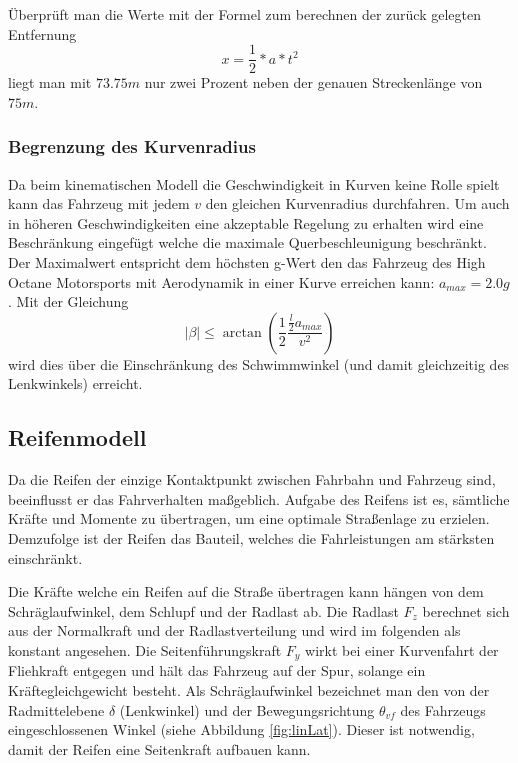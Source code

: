 \documentclass{like}
\begin{document}
Überprüft man die Werte mit der Formel zum berechnen der zurück gelegten Entfernung 
\begin{equation}
x = \frac{1}{2} * a * t^2  
\end{equation}
liegt man mit \(73.75m\) nur zwei Prozent neben der genauen Streckenlänge von \(75m\).

\subsubsection*{Begrenzung des Kurvenradius}
Da beim kinematischen Modell die Geschwindigkeit in Kurven keine Rolle spielt kann das Fahrzeug mit jedem \(v\) den gleichen Kurvenradius durchfahren. Um auch in höheren Geschwindigkeiten eine akzeptable Regelung zu erhalten wird eine Beschränkung eingefügt welche die maximale Querbeschleunigung beschränkt. Der Maximalwert entspricht dem höchsten g-Wert den das Fahrzeug des High Octane Motorsports mit Aerodynamik in einer Kurve erreichen kann: $a_{max} = 2.0g$. 
Mit der Gleichung
\begin{equation}
	|\beta| \leq \arctan(\frac{1}{2} \frac{\frac{l}{2} a_{max}}{v^2})
\end{equation}
wird dies über die Einschränkung des Schwimmwinkel (und damit gleichzeitig des Lenkwinkels) erreicht.


\subsection{Reifenmodell}
\label{tireModel}
Da die Reifen der einzige Kontaktpunkt zwischen Fahrbahn und Fahrzeug sind,  beeinflusst er das Fahrverhalten maßgeblich. Aufgabe des Reifens ist es, sämtliche Kräfte und Momente zu übertragen, um eine optimale Straßenlage zu erzielen. Demzufolge ist der Reifen das Bauteil, welches die Fahrleistungen am stärksten einschränkt.

Die Kräfte welche ein Reifen auf die Straße übertragen kann hängen von dem Schräglaufwinkel, dem Schlupf und der Radlast ab. Die Radlast \(F_z\) berechnet sich aus der Normalkraft und der Radlastverteilung und wird im folgenden als konstant angesehen.
Die Seitenführungskraft \(F_y\) wirkt bei einer Kurvenfahrt der Fliehkraft entgegen und hält das Fahrzeug auf der Spur, solange ein Kräftegleichgewicht besteht. Als Schräglaufwinkel bezeichnet man den von der Radmittelebene \(\delta\) (Lenkwinkel) und der Bewegungsrichtung \(\theta_{vf}\) des Fahrzeugs eingeschlossenen Winkel (siehe Abbildung \ref{fig:linLat}). Dieser ist notwendig, damit der Reifen eine Seitenkraft aufbauen kann. \\
\end{document}
